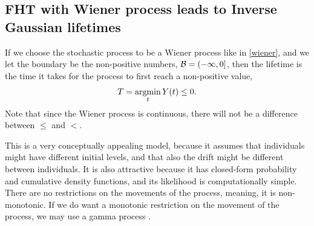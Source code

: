 \subsection{FHT with Wiener process leads to Inverse Gaussian lifetimes}
If we choose the stochastic process to be a Wiener process like in \eqref{wiener}, and we let the boundary be the non-positive numbers, $\mathcal{B}=(-\infty,0]$, then the lifetime is the time it takes for the process to first reach a non-positive value,
\begin{equation}
    T=\operatorname*{argmin}_{t}Y(t)\leq0.
\end{equation}
Note that since the Wiener process is continuous, there will not be a difference between $\leq$ and $<$.

This is a very conceptually appealing model, because it assumes that individuals might have different initial levels, and that also the drift might be different between individuals. It is also attractive because it has closed-form probability and cumulative density functions, and its likelihood is computationally simple. There are no restrictions on the movements of the process, meaning, it is non-monotonic. If we do want a monotonic restriction on the movement of the process, we may use a gamma process \citep{leewhitmore2006}.


